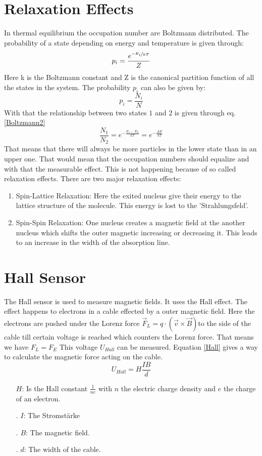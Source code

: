 \section{Relaxation Effects}
In thermal equilibrium the occupation number are Boltzmann distributed.
The probability of a state depending on energy and temperature is given through:
\begin{equation}
p_i=\frac{e^{\nicefrac{-E_i}{kT}}}{Z}
\label{Boltzmann}
\end{equation}
Here k is the Boltzmann constant and Z is the canonical partition function of all the states in the system. The probability $p_i$ can also be given by: $$p_i=\frac{N_i}{N}$$ With that the relationship between two states $1$ and $2$ is given through eq.\ref{Boltzmann2}
\begin{equation}
\frac{N_1}{N_2}=e^{-\frac{E_1-E_2}{kT}}=e^{-\frac{\Delta E}{kT}}
\label{Boltzmann2}
\end{equation}
That means that there will always be more particles in the lower state than in an upper one. That would mean that the occupation numbers should equalize and with that the measurable effect. This is not happening because of so called relaxation effects. There are two major relaxation effects:
\begin{enumerate}
	\item Spin-Lattice Relaxation: Here the exited nucleus give their energy to the lattice structure of the molecule. This energy is lost to the 'Strahlungsfeld'.
	\item Spin-Spin Relaxation: One nucleus creates a magnetic field at the another nucleus which shifts the outer magnetic increasing or decreasing it. This leads to an increase in the width of the absorption line.
\end{enumerate} 
\section{Hall Sensor}
The Hall sensor is used to measure magnetic fields. It uses the Hall effect. The effect happens to electrons in a cable effected by a outer magnetic field. Here the electrons are pushed under the Lorenz force $\vec{F}_L=q\cdot(\vec{v}\times \vec{B})$to the side of the cable till certain voltage is reached which counters the Lorenz force. That means we have $F_L=F_E$ This voltage $U_{Hall}$ can be measured. Equation \ref{Hall} gives a way to calculate the magnetic force acting on the cable. 
\begin{equation}
U_{Hall}=H\frac{IB}{d}
\label{Hall}
\end{equation}
\begin{enumerate}
	\item[] $H$: Is the Hall constant $\frac{1}{ne}$ with $n$ the electric charge density and $e$ the charge of an electron.
	\item[.] $I$: The \color{red} Stromstärke \color{black}
	\item[.] $B$: The magnetic field.
	\item[.] $d$: The width of the cable.
\end{enumerate}
